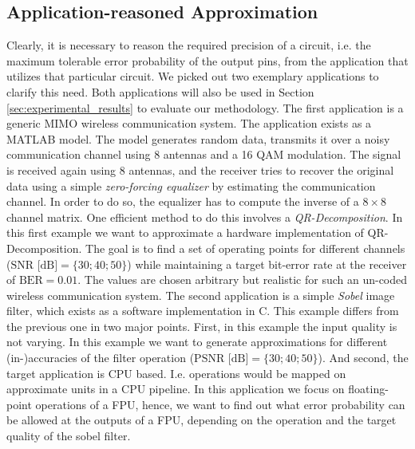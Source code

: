 \documentclass[conference]{IEEEtran}
\begin{document}
\subsection{Application-reasoned Approximation}
\label{subsec:application_reasoned}
Clearly, it is necessary to reason the required precision of a circuit, i.e. the maximum tolerable error probability of the output pins, from the application that utilizes that particular circuit. We picked out two exemplary applications to clarify this need. Both applications will also be used in Section \ref{sec:experimental_results} to evaluate our methodology. The first application is a generic MIMO wireless communication system. The application exists as a MATLAB model. The model generates random data, transmits it over a noisy communication channel using 8 antennas and a 16 QAM modulation. The signal is received again using 8 antennas, and the receiver tries to recover the original data using a simple \emph{zero-forcing equalizer} by estimating the communication channel. In order to do so, the equalizer has to compute the inverse of a $8\times8$ channel matrix. One efficient method to do this involves a \emph{QR-Decomposition}. In this first example we want to approximate a hardware implementation of QR-Decomposition. The goal is to find a set of operating points for different channels (\mbox{$\textrm{SNR [dB]} = \{30; 40; 50\}$}) while maintaining a target bit-error rate at the receiver of \mbox{$\textrm{BER}=0.01$}. The values are chosen arbitrary but realistic for such an un-coded wireless communication system. The second application is a simple \emph{Sobel} image filter, which exists as a software implementation in C. This example differs from the previous one in two major points. First, in this example the input quality is not varying. In this example we want to generate approximations for different (in-)accuracies of the filter operation (\mbox{$\textrm{PSNR [dB]} = \{30; 40; 50\}$}). And second, the target application is CPU based. I.e. operations would be mapped on approximate units in a CPU pipeline. In this application we focus on floating-point operations of a FPU, hence, we want to find out what error probability can be allowed at the outputs of a FPU, depending on the operation and the target quality of the sobel filter.
\end{document}
